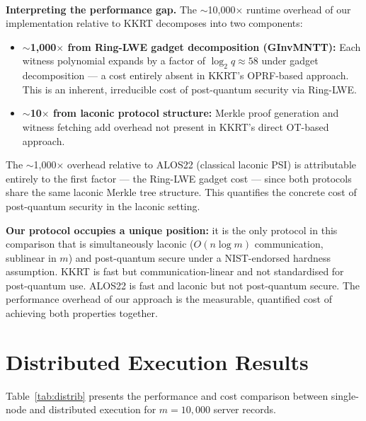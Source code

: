\\

\textbf{Interpreting the performance gap.} The $\sim$10,000$\times$ runtime overhead
of our implementation relative to KKRT decomposes into two components:
\begin{itemize}
    \item \textbf{$\sim$1,000$\times$ from Ring-LWE gadget decomposition (GInvMNTT):}
          Each witness polynomial expands by a factor of $\log_2 q \approx 58$ under
          gadget decomposition --- a cost entirely absent in KKRT's OPRF-based approach.
          This is an inherent, irreducible cost of post-quantum security via Ring-LWE.
    \item \textbf{$\sim$10$\times$ from laconic protocol structure:} Merkle proof
          generation and witness fetching add overhead not present in KKRT's direct
          OT-based approach.
\end{itemize}

The $\sim$1,000$\times$ overhead relative to ALOS22 (classical laconic PSI) is attributable
entirely to the first factor --- the Ring-LWE gadget cost --- since both protocols
share the same laconic Merkle tree structure. This quantifies the concrete cost
of post-quantum security in the laconic setting.

\textbf{Our protocol occupies a unique position:} it is the only protocol in this
comparison that is simultaneously laconic ($O(n \log m)$ communication, sublinear
in $m$) and post-quantum secure under a NIST-endorsed hardness assumption. KKRT
is fast but communication-linear and not standardised for post-quantum use. ALOS22
is fast and laconic but not post-quantum secure. The performance overhead of our
approach is the measurable, quantified cost of achieving both properties together.

\section{Distributed Execution Results}

Table~\ref{tab:distrib} presents the performance and cost comparison between single-node
and distributed execution for $m = 10{,}000$ server records.

